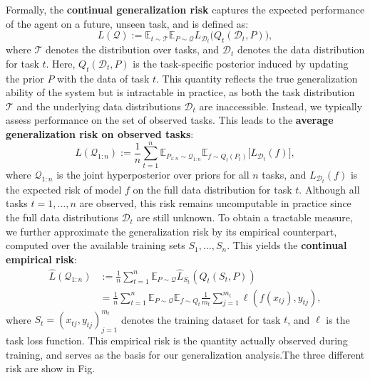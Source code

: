 \documentclass[letterpaper]{article} %
\begin{document}
Formally, the \textbf{continual generalization risk} captures the expected performance of the agent on a future, unseen task, and is defined as:
\begin{equation}
L(\mathcal{Q}) := \mathbb{E}_{t \sim \mathcal{T}}\mathbb{E}_{P \sim \mathcal{Q}}L_{\mathcal{D}_t}\big(Q_t(\mathcal{D}_t, P)\big),
\end{equation}
where $\mathcal{T}$ denotes the distribution over tasks, and $\mathcal{D}_t$ denotes the data distribution for task $t$. Here, $Q_t(\mathcal{D}_t, P)$ is the task-specific posterior induced by updating the prior $P$ with the data of task $t$. This quantity reflects the true generalization ability of the system but is intractable in practice, as both the task distribution $\mathcal{T}$ and the underlying data distributions $\mathcal{D}_t$ are inaccessible. 
Instead, we typically assess performance on the set of observed tasks. This leads to the \textbf{average generalization risk on observed tasks}:
\begin{equation}
L(\mathcal{Q}_{1:n}) :=
\frac{1}{n} \sum_{t=1}^n
\mathbb{E}_{P_{1:n} \sim \mathcal{Q}_{1:n}}
\mathbb{E}_{f \sim Q_t(P_t)}
\big[
L_{\mathcal{D}_t}(f)
\big],
\end{equation}
where $\mathcal{Q}_{1:n}$ is the joint hyperposterior over priors for all $n$ tasks, and $L_{\mathcal{D}_t}(f)$ is the expected risk of model $f$ on the full data distribution for task $t$. Although all tasks $t=1,\dots,n$ are observed, this risk remains uncomputable in practice since the full data distributions $\mathcal{D}_t$ are still unknown. To obtain a tractable measure, we further approximate the generalization risk by its empirical counterpart, computed over the available training sets $S_1,\dots,S_n$. This yields the \textbf{continual empirical risk}:
\begin{equation}
\begin{aligned}
\widehat{L}(\mathcal{Q}_{1:n}) 
&:= \frac{1}{n} \sum_{t=1}^n \mathbb{E}_{P \sim \mathcal{Q}} \widehat{L}_{S_t}(Q_t(S_t, P)) \\
&= \frac{1}{n} \sum_{t=1}^n \mathbb{E}_{P \sim \mathcal{Q}} \mathbb{E}_{f\sim Q_t} \frac{1}{m_t} \sum_{j=1}^{m_t} \ell(f(x_{tj}), y_{tj}),
\end{aligned}
\end{equation}
where $S_t = {(x_{tj}, y_{tj})}_{j=1}^{m_t}$ denotes the training dataset for task $t$, and $\ell$ is the task loss function. This empirical risk is the quantity actually observed during training, and serves as the basis for our generalization analysis.The three different risk are show in Fig.
\end{document}
